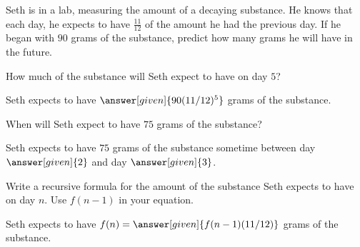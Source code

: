 \documentclass[nooutcomes]{ximera}
\begin{document}
\begin{problem}
Seth is in a lab, measuring the amount of a decaying substance.  He knows that each day, he expects to have $\frac{11}{12}$ of the amount he had the previous day.  If he began with $90$ grams of the substance, predict how many grams he will have in the future.

\begin{problem}
How much of the substance will Seth expect to have on day $5$?
\begin{prompt}
Seth expects to have $\answer[given]{90(11/12)^{5}}$ grams of the substance.
\end{prompt}




\begin{problem}

When will Seth expect to have $75$ grams of the substance?
\begin{prompt}
Seth expects to have $75$ grams of the substance sometime between day $\answer[given]{2}$ and day $\answer[given]{3}$.
\end{prompt}





\begin{problem}

Write a recursive formula for the amount of the substance Seth expects to have on day $n$.  Use $f(n-1)$ in your equation.
\begin{prompt}
Seth expects to have $f(n) = \answer[given]{f(n-1)(11/12)}$ grams of the substance.
\end{prompt}





\begin{problem}


\end{problem}
\end{problem}
\end{problem}
\end{problem}
\end{problem}
\end{document}
